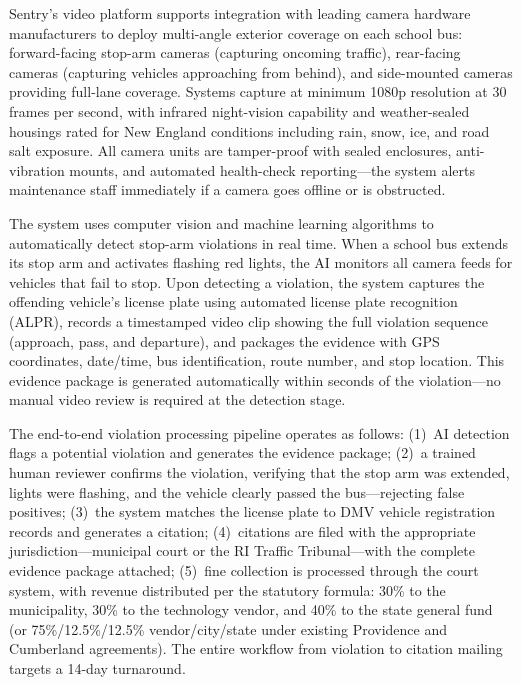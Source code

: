 
\begin{description}[style=nextline, leftmargin=0.5cm]
    \item[\faIcon{camera} \textbf{Camera Hardware:}] Sentry's video platform supports integration with leading camera hardware manufacturers to deploy multi-angle exterior coverage on each school bus: forward-facing stop-arm cameras (capturing oncoming traffic), rear-facing cameras (capturing vehicles approaching from behind), and side-mounted cameras providing full-lane coverage. Systems capture at minimum 1080p resolution at 30 frames per second, with infrared night-vision capability and weather-sealed housings rated for New England conditions including rain, snow, ice, and road salt exposure. All camera units are tamper-proof with sealed enclosures, anti-vibration mounts, and automated health-check reporting---the system alerts maintenance staff immediately if a camera goes offline or is obstructed.

    \item[\faIcon{brain} \textbf{AI-Powered Detection:}] The system uses computer vision and machine learning algorithms to automatically detect stop-arm violations in real time. When a school bus extends its stop arm and activates flashing red lights, the AI monitors all camera feeds for vehicles that fail to stop. Upon detecting a violation, the system captures the offending vehicle's license plate using automated license plate recognition (ALPR), records a timestamped video clip showing the full violation sequence (approach, pass, and departure), and packages the evidence with GPS coordinates, date/time, bus identification, route number, and stop location. This evidence package is generated automatically within seconds of the violation---no manual video review is required at the detection stage.

    \item[\faIcon{gavel} \textbf{Violation Processing Pipeline:}] The end-to-end violation processing pipeline operates as follows: (1)~AI detection flags a potential violation and generates the evidence package; (2)~a trained human reviewer confirms the violation, verifying that the stop arm was extended, lights were flashing, and the vehicle clearly passed the bus---rejecting false positives; (3)~the system matches the license plate to DMV vehicle registration records and generates a citation; (4)~citations are filed with the appropriate jurisdiction---municipal court or the RI Traffic Tribunal---with the complete evidence package attached; (5)~fine collection is processed through the court system, with revenue distributed per the statutory formula: 30\% to the municipality, 30\% to the technology vendor, and 40\% to the state general fund (or 75\%/12.5\%/12.5\% vendor/city/state under existing Providence and Cumberland agreements). The entire workflow from violation to citation mailing targets a 14-day turnaround.


\end{description}
